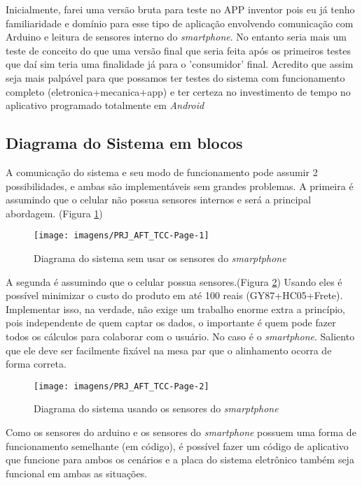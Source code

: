 \documentclass[a4paper, 12pt]{article}
\begin{document}
Inicialmente, farei uma versão bruta para teste no APP inventor pois eu já tenho familiaridade e domínio para esse tipo de aplicação envolvendo comunicação com Arduino e leitura de sensores interno do \textit{smartphone}. No entanto seria mais um teste de conceito do que uma versão final que seria feita após os primeiros testes que daí sim teria uma finalidade já para o 'consumidor' final. Acredito que assim seja mais palpável para que possamos ter testes do sistema com funcionamento completo (eletronica+mecanica+app) e ter certeza no investimento de tempo no aplicativo programado totalmente em \textit{Android}

\subsection{Diagrama do Sistema em blocos}

A comunicação do sistema e seu modo de funcionamento pode assumir 2 possibilidades, e ambas são implementáveis sem grandes problemas. A primeira é assumindo que o celular não possua sensores internos e será a principal abordagem. (Figura \ref{fig:prjafttcc-page-1})

\begin{figure}[!htb]
	\centering
	\texttt{[image: imagens/PRJ\_AFT\_TCC-Page-1]}
	\caption{Diagrama do sistema sem usar os sensores do \textit{smarptphone}}
	\label{fig:prjafttcc-page-1}
\end{figure}


A segunda é assumindo que o celular possua sensores.(Figura \ref{fig:prjafttcc-page-2}) Usando eles é possível minimizar o custo do produto em até 100 reais (GY87+HC05+Frete). Implementar isso, na verdade, não exige um trabalho enorme extra a princípio, pois independente de quem captar os dados, o importante é quem pode fazer todos os cálculos para colaborar com o usuário. No caso é o \textit{smartphone}. Saliento que ele deve ser facilmente fixável na mesa par que o alinhamento ocorra de forma correta.

\begin{figure}[!htb]
	\centering
	\texttt{[image: imagens/PRJ\_AFT\_TCC-Page-2]}
	\caption{Diagrama do sistema usando os sensores do \textit{smarptphone}}
	\label{fig:prjafttcc-page-2}
\end{figure}

Como os sensores do arduino e os sensores do \textit{smartphone} possuem uma forma de funcionamento semelhante (em código), é possível fazer um código de aplicativo que funcione para ambos os cenários e a placa do sistema eletrônico também seja funcional em ambas as situações.
\end{document}
